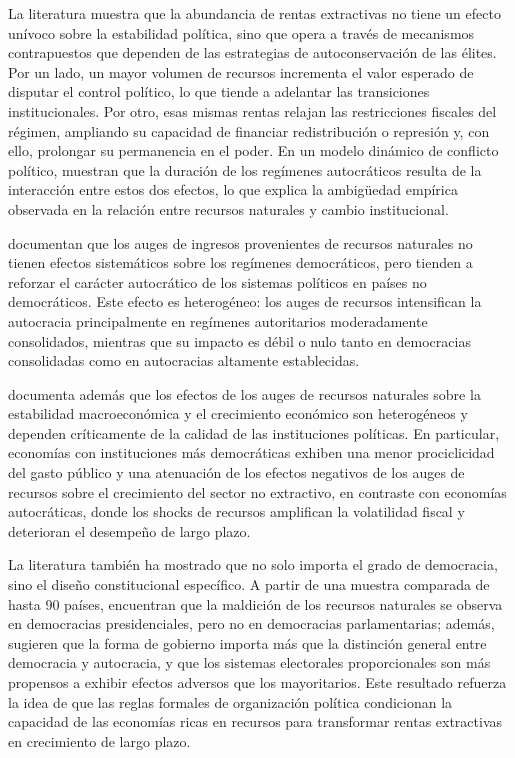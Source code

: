 \documentclass[../../TFM.tex]{subfiles}
\begin{document}
	La literatura muestra que la abundancia de rentas extractivas no tiene un efecto unívoco sobre la estabilidad política, sino que opera a través de mecanismos contrapuestos que dependen de las estrategias de autoconservación de las élites. Por un lado, un mayor volumen de recursos incrementa el valor esperado de disputar el control político, lo que tiende a adelantar las transiciones institucionales. Por otro, esas mismas rentas relajan las restricciones fiscales del régimen, ampliando su capacidad de financiar redistribución o represión y, con ello, prolongar su permanencia en el poder. En un modelo dinámico de conflicto político, \textcite{Boucekkine2016} muestran que la duración de los regímenes autocráticos resulta de la interacción entre estos dos efectos, lo que explica la ambigüedad empírica observada en la relación entre recursos naturales y cambio institucional.
	
	\textcite{Caselli2015} documentan que los auges de ingresos provenientes de recursos naturales no tienen efectos sistemáticos sobre los regímenes democráticos, pero tienden a reforzar el carácter autocrático de los sistemas políticos en países no democráticos. Este efecto es heterogéneo: los auges de recursos intensifican la autocracia principalmente en regímenes autoritarios moderadamente consolidados, mientras que su impacto es débil o nulo tanto en democracias consolidadas como en autocracias altamente establecidas.
	
	\textcite{Arezki2012} documenta además que los efectos de los auges de recursos naturales sobre la estabilidad macroeconómica y el crecimiento económico son heterogéneos y dependen críticamente de la calidad de las instituciones políticas. En particular, economías con instituciones más democráticas exhiben una menor prociclicidad del gasto público y una atenuación de los efectos negativos de los auges de recursos sobre el crecimiento del sector no extractivo, en contraste con economías autocráticas, donde los shocks de recursos amplifican la volatilidad fiscal y deterioran el desempeño de largo plazo.
	
	La literatura también ha mostrado que no solo importa el grado de democracia, sino el diseño constitucional específico. A partir de una muestra comparada de hasta 90 países, \textcite{Andersen2008} encuentran que la maldición de los recursos naturales se observa en democracias presidenciales, pero no en democracias parlamentarias; además, sugieren que la forma de gobierno importa más que la distinción general entre democracia y autocracia, y que los sistemas electorales proporcionales son más propensos a exhibir efectos adversos que los mayoritarios. Este resultado refuerza la idea de que las reglas formales de organización política condicionan la capacidad de las economías ricas en recursos para transformar rentas extractivas en crecimiento de largo plazo.
	
\end{document}
